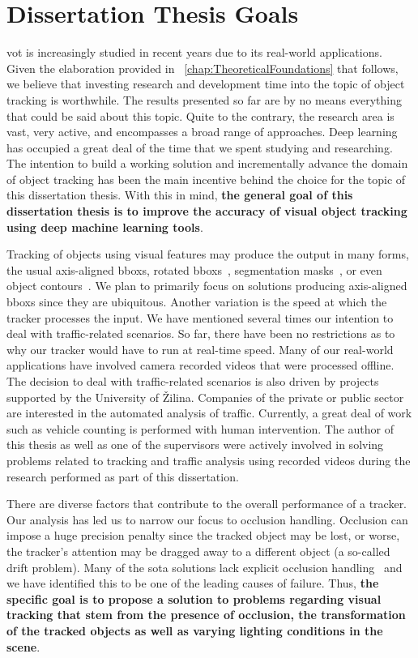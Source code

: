 \chapter{Dissertation Thesis Goals}
\label{chap:Goals}

\Gls{vot} is increasingly studied in recent years due to its real-world applications. Given the elaboration provided in \chaptertext{}~\ref{chap:TheoreticalFoundations} that follows, we believe that investing research and development time into the topic of object tracking is worthwhile. The results presented so far are by no means everything that could be said about this topic. Quite to the contrary, the research area is vast, very active, and encompasses a broad range of approaches. Deep learning has occupied a great deal of the time that we spent studying and researching. The intention to build a working solution and incrementally advance the domain of object tracking has been the main incentive behind the choice for the topic of this dissertation thesis. With this in mind, \textbf{the general goal of this dissertation thesis is to improve the accuracy of visual object tracking using deep machine learning tools}.

Tracking of objects using visual features may produce the output in many forms, the usual axis-aligned \glspl{bbox}, rotated \glspl{bbox}~\cite{chen2019rotbboxes}, segmentation masks~\cite{wang2019siammask}, or even object contours~\cite{yang2016encoderdecoder}. We plan to primarily focus on solutions producing axis-aligned \glspl{bbox} since they are ubiquitous. Another variation is the speed at which the tracker processes the input. We have mentioned several times our intention to deal with traffic-related scenarios. So far, there have been no restrictions as to why our tracker would have to run at real-time speed. Many of our real-world applications have involved camera recorded videos that were processed offline. The decision to deal with traffic-related scenarios is also driven by projects supported by the University of Žilina. Companies of the private or public sector are interested in the automated analysis of traffic. Currently, a great deal of work such as vehicle counting is performed with human intervention. The author of this thesis as well as one of the supervisors were actively involved in solving problems related to tracking and traffic analysis using recorded videos during the research performed as part of this dissertation.

There are diverse factors that contribute to the overall performance of a tracker. Our analysis has led us to narrow our focus to occlusion handling. Occlusion can impose a huge precision penalty since the tracked object may be lost, or worse, the tracker's attention may be dragged away to a different object (a so-called drift problem). Many of the \gls{sota} solutions lack explicit occlusion handling~\cite{guo2019siamcar, li2018siamrpn, wang2019siammask} and we have identified this to be one of the leading causes of failure. Thus, \textbf{the specific goal is to propose a solution to problems regarding visual tracking that stem from the presence of occlusion, the transformation of the tracked objects as well as varying lighting conditions in the scene}.

